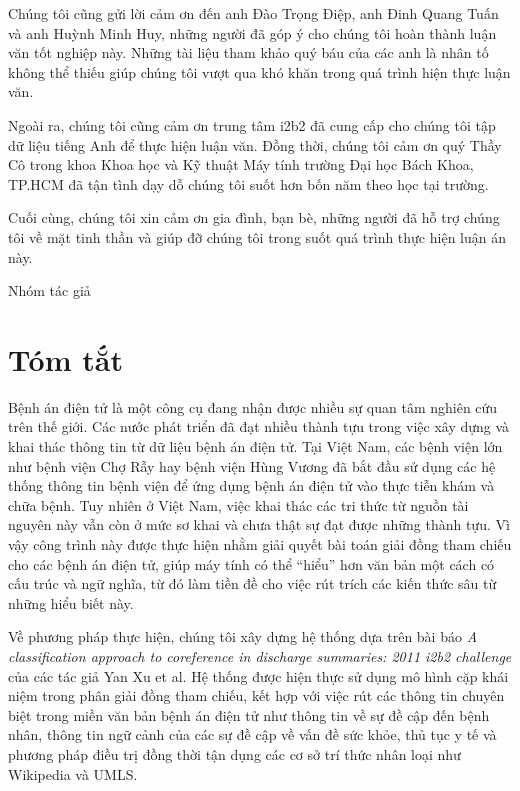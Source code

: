 \documentclass[12pt,a4paper,twoside]{report}
\begin{document}
Chúng tôi cũng gửi lời cảm ơn đến anh Đào Trọng Điệp, anh Đinh Quang Tuấn và anh Huỳnh Minh Huy, những người đã góp ý cho chúng tôi hoàn thành luận văn tốt nghiệp này. Những tài liệu tham khảo quý báu của các anh là nhân tố không thể thiếu giúp chúng tôi vượt qua khó khăn trong quá trình hiện thực luận văn.

Ngoài ra, chúng tôi cũng cảm ơn trung tâm i2b2 đã cung cấp cho chúng tôi tập dữ liệu tiếng Anh để thực hiện luận văn. Đồng thời, chúng tôi cảm ơn quý Thầy Cô trong khoa Khoa học và Kỹ thuật Máy tính trường Đại học Bách Khoa, TP.HCM đã tận tình dạy dỗ chúng tôi suốt hơn bốn năm theo học tại trường.

Cuối cùng, chúng tôi xin cảm ơn gia đình, bạn bè, những người đã hỗ trợ chúng tôi về mặt tinh thần và giúp đỡ chúng tôi trong suốt quá trình thực hiện luận án này.

\begin{flushright}
Nhóm tác giả
\end{flushright}

\chapter*{Tóm tắt}
Bệnh án điện tử là một công cụ đang nhận được nhiều sự quan tâm nghiên cứu trên thế giới. Các nước phát triển đã đạt nhiều thành tựu trong việc xây dựng và khai thác thông tin từ dữ liệu bệnh án điện tử. Tại Việt Nam, các bệnh viện lớn như bệnh viện Chợ Rẫy hay bệnh viện Hùng Vương đã bắt đầu sử dụng các hệ thống thông tin bệnh viện để ứng dụng bệnh án điện tử vào thực tiễn khám và chữa bệnh. Tuy nhiên ở Việt Nam, việc khai thác các tri thức từ nguồn tài nguyên này vẫn còn ở mức sơ khai và chưa thật sự đạt được những thành tựu. Vì vậy công trình này được thực hiện nhằm giải quyết bài toán giải đồng tham chiếu cho các bệnh án điện tử, giúp máy tính có thể ``hiểu'' hơn văn bản một cách có cấu trúc và ngữ nghĩa, từ đó làm tiền đề cho việc rút trích các kiến thức sâu từ những hiểu biết này.

Về phương pháp thực hiện, chúng tôi xây dựng hệ thống dựa trên bài báo \emph{A classification approach to coreference in discharge summaries: 2011 i2b2 challenge} của các tác giả Yan Xu et al. Hệ thống được hiện thực sử dụng mô hình cặp khái niệm trong phân giải đồng tham chiếu, kết hợp với việc rút các thông tin chuyên biệt trong miền văn bản bệnh án điện tử như thông tin về sự đề cập đến bệnh nhân, thông tin ngữ cảnh của các sự đề cập về vấn đề sức khỏe, thủ tục y tế và phương pháp điều trị đồng thời tận dụng các cơ sở trí thức nhân loại như Wikipedia và UMLS. 
\end{document}
